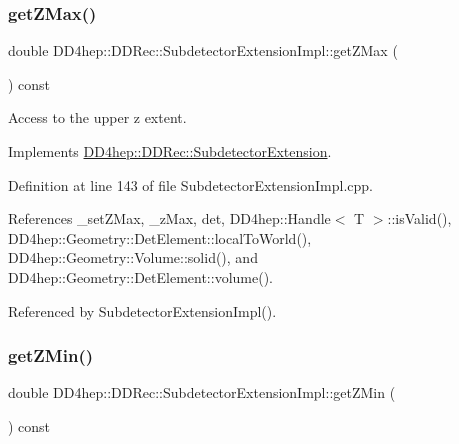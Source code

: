\subsubsection{\texorpdfstring{get\+Z\+Max()}{getZMax()}}
{\footnotesize\ttfamily double D\+D4hep\+::\+D\+D\+Rec\+::\+Subdetector\+Extension\+Impl\+::get\+Z\+Max (\begin{DoxyParamCaption}{ }\end{DoxyParamCaption}) const\hspace{0.3cm}{\ttfamily [virtual]}}



Access to the upper z extent. 



Implements \hyperlink{class_d_d4hep_1_1_d_d_rec_1_1_subdetector_extension_aea56290179f8271d6a2a3be1658d9b47}{D\+D4hep\+::\+D\+D\+Rec\+::\+Subdetector\+Extension}.



Definition at line 143 of file Subdetector\+Extension\+Impl.\+cpp.



References \+\_\+set\+Z\+Max, \+\_\+z\+Max, det, D\+D4hep\+::\+Handle$<$ T $>$\+::is\+Valid(), D\+D4hep\+::\+Geometry\+::\+Det\+Element\+::local\+To\+World(), D\+D4hep\+::\+Geometry\+::\+Volume\+::solid(), and D\+D4hep\+::\+Geometry\+::\+Det\+Element\+::volume().



Referenced by Subdetector\+Extension\+Impl().

\hypertarget{class_d_d4hep_1_1_d_d_rec_1_1_subdetector_extension_impl_a49a166b8f3d0ae8f96f5440d792b9dff}{}\label{class_d_d4hep_1_1_d_d_rec_1_1_subdetector_extension_impl_a49a166b8f3d0ae8f96f5440d792b9dff} 
\subsubsection{\texorpdfstring{get\+Z\+Min()}{getZMin()}}
{\footnotesize\ttfamily double D\+D4hep\+::\+D\+D\+Rec\+::\+Subdetector\+Extension\+Impl\+::get\+Z\+Min (\begin{DoxyParamCaption}{ }\end{DoxyParamCaption}) const\hspace{0.3cm}{\ttfamily [virtual]}}



